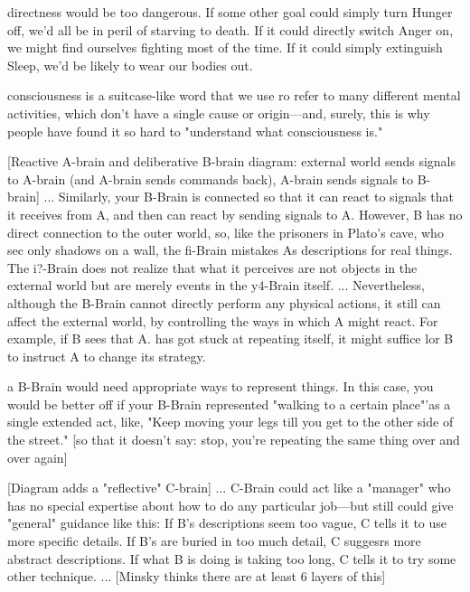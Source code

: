 \documentclass[10pt,a4paper]{article}
\begin{document}
directness would be too dangerous. If some other goal could simply turn Hunger off, we'd all be in peril of starving to death. If it could directly switch Anger on, we might find ourselves fighting most of the time. If it could simply extinguish Sleep, we'd be likely to wear our bodies out. \cite[p.~93]{minsky}

consciousness is a suitcase-like word that we use ro refer to many different mental activities, which don't have a single cause or origin—and, surely, this is why people have found it so hard to "understand what consciousness is." \cite[p.~97]{minsky}

[Reactive A-brain and deliberative B-brain diagram: external world sends signals to A-brain (and A-brain sends commands back), A-brain sends signals to B-brain]
...
Similarly, your B-Brain is connected so that it can react to signals that it receives from A, and then can react by sending signals to A. However, B has no direct connection to the outer world, so, like the prisoners in Plato's cave, who sec only shadows on a wall, the fi-Brain mistakes As descriptions for real things. The i?-Brain does not realize that what it perceives are not objects in the external world but are merely events in the y4-Brain itself.
...
Nevertheless, although the B-Brain cannot directly perform any physical actions, it still can affect the external world, by controlling the ways in which A might react. For example, if B sees that A. has got stuck at repeating itself, it might suffice lor B to instruct A to change its strategy.  \cite[p.~100-101]{minsky}

a B-Brain would need appropriate ways to represent things. In this case, you would be better off if your B-Brain represented "walking to a certain place"'as a single extended act, like, "Keep moving your legs till you get to the other side of the street." [so that it doesn't say: stop, you're repeating the same thing over and over again] \cite[p.~101]{minsky}

[Diagram adds a "reflective" C-brain]
...
C-Brain could act like a "manager" who has no special expertise about how to do any particular job—but still could give "general" guidance like this:
If B's descriptions seem too vague, C tells it to use more specific details.
If B's are buried in too much detail, C suggesrs more abstract descriptions.
If what B is doing is taking too long, C tells it to try some other technique.
...
[Minsky thinks there are at least 6 layers of this]\cite[p.~102]{minsky}
\end{document}
